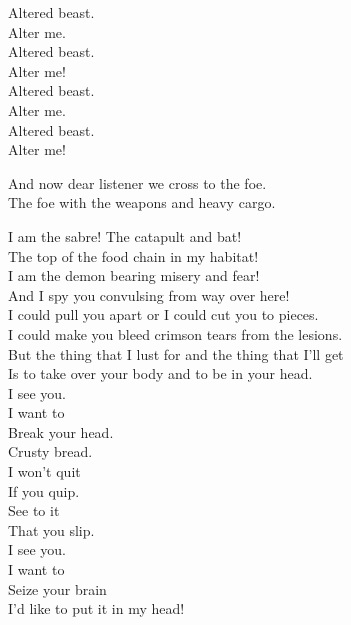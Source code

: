 Altered beast. \\
Alter me. \\
Altered beast. \\
Alter me! \\

Altered beast. \\
Alter me. \\
Altered beast. \\
Alter me! \\





And now dear listener we cross to the foe. \\
The foe with the weapons and heavy cargo. \\


I am the sabre! The catapult and bat! \\
The top of the food chain in my habitat! \\

I am the demon bearing misery and fear! \\
And I spy you convulsing from way over here! \\

I could pull you apart or I could cut you to pieces. \\
I could make you bleed crimson tears from the lesions. \\

But the thing that I lust for and the thing that I'll get \\
Is to take over your body and to be in your head. \\

I see you. \\
I want to \\
Break your head. \\
Crusty bread. \\

I won't quit \\
If you quip. \\
See to it \\
That you slip. \\

I see you. \\
I want to \\
Seize your brain \\
I'd like to put it in my head! \\

